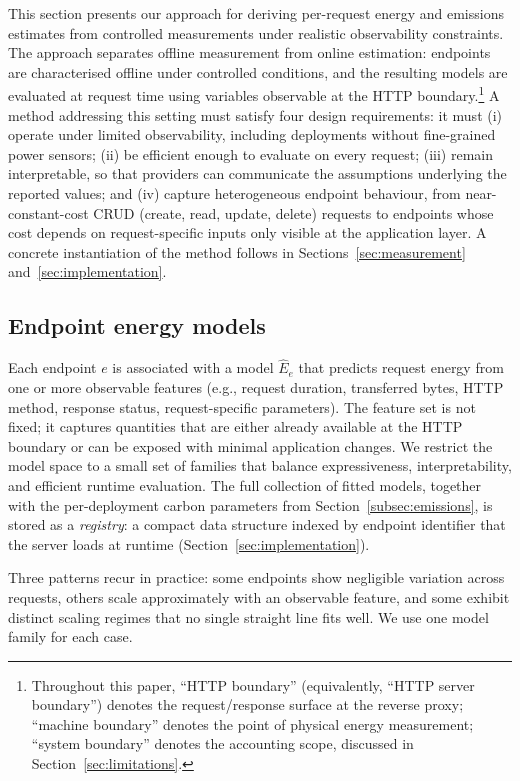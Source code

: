 \documentclass[sigconf]{acmart}
\begin{document}
This section presents our approach for deriving per-request energy and emissions estimates from controlled measurements under realistic observability constraints. The approach separates offline measurement from online estimation: endpoints are characterised offline under controlled conditions, and the resulting models are evaluated at request time using variables observable at the HTTP boundary.\footnote{Throughout this paper, ``HTTP boundary'' (equivalently, ``HTTP server boundary'') denotes the request/response surface at the reverse proxy; ``machine boundary'' denotes the point of physical energy measurement; ``system boundary'' denotes the accounting scope, discussed in Section~\ref{sec:limitations}.} A method addressing this setting must satisfy four design requirements: it must (i) operate under limited observability, including deployments without fine-grained power sensors; (ii) be efficient enough to evaluate on every request; (iii) remain interpretable, so that providers can communicate the assumptions underlying the reported values; and (iv) capture heterogeneous endpoint behaviour, from near-constant-cost CRUD (create, read, update, delete) requests to endpoints whose cost depends on request-specific inputs only visible at the application layer. A concrete instantiation of the method follows in Sections~\ref{sec:measurement} and~\ref{sec:implementation}.


\subsection{Endpoint energy models}
\label{subsec:model}

Each endpoint \(e\) is associated with a model \(\widehat{E}_e\) that predicts request energy from one or more observable features (e.g., request duration, transferred bytes, HTTP method, response status, request-specific parameters). The feature set is not fixed; it captures quantities that are either already available at the HTTP boundary or can be exposed with minimal application changes. We restrict the model space to a small set of families that balance expressiveness, interpretability, and efficient runtime evaluation. The full collection of fitted models, together with the per-deployment carbon parameters from Section~\ref{subsec:emissions}, is stored as a \emph{registry}: a compact data structure indexed by endpoint identifier that the server loads at runtime (Section~\ref{sec:implementation}).

Three patterns recur in practice: some endpoints show negligible variation across requests, others scale approximately with an observable feature, and some exhibit distinct scaling regimes that no single straight line fits well. We use one model family for each case.
\end{document}

